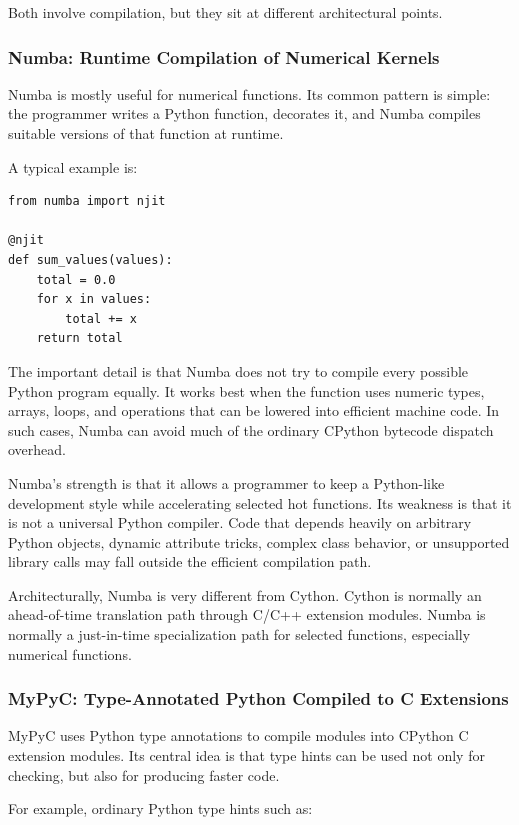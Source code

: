 Both involve compilation, but they sit at different architectural points.

\subsubsection{Numba: Runtime Compilation of Numerical Kernels}

Numba is mostly useful for numerical functions. Its common pattern is simple: the programmer writes a Python function, decorates it, and Numba compiles suitable versions of that function at runtime.

A typical example is:

\begin{verbatim}
from numba import njit

@njit
def sum_values(values):
    total = 0.0
    for x in values:
        total += x
    return total
\end{verbatim}

The important detail is that Numba does not try to compile every possible Python program equally. It works best when the function uses numeric types, arrays, loops, and operations that can be lowered into efficient machine code. In such cases, Numba can avoid much of the ordinary CPython bytecode dispatch overhead.

Numba's strength is that it allows a programmer to keep a Python-like development style while accelerating selected hot functions. Its weakness is that it is not a universal Python compiler. Code that depends heavily on arbitrary Python objects, dynamic attribute tricks, complex class behavior, or unsupported library calls may fall outside the efficient compilation path.

Architecturally, Numba is very different from Cython. Cython is normally an ahead-of-time translation path through C/C++ extension modules. Numba is normally a just-in-time specialization path for selected functions, especially numerical functions.

\subsubsection{MyPyC: Type-Annotated Python Compiled to C Extensions}

MyPyC uses Python type annotations to compile modules into CPython C extension modules. Its central idea is that type hints can be used not only for checking, but also for producing faster code.

For example, ordinary Python type hints such as:

